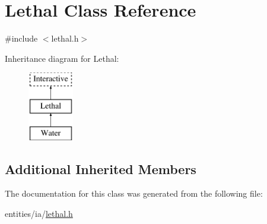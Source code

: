\hypertarget{class_lethal}{\section{Lethal Class Reference}
\label{class_lethal}
}


{\ttfamily \#include $<$lethal.\-h$>$}

Inheritance diagram for Lethal\-:\begin{figure}[H]
\begin{center}
\leavevmode
\includegraphics[height=3.000000cm]{class_lethal}
\end{center}
\end{figure}
\subsection*{Additional Inherited Members}


The documentation for this class was generated from the following file\-:\begin{DoxyCompactItemize}
\item 
entities/ia/\hyperlink{lethal_8h}{lethal.\-h}\end{DoxyCompactItemize}
